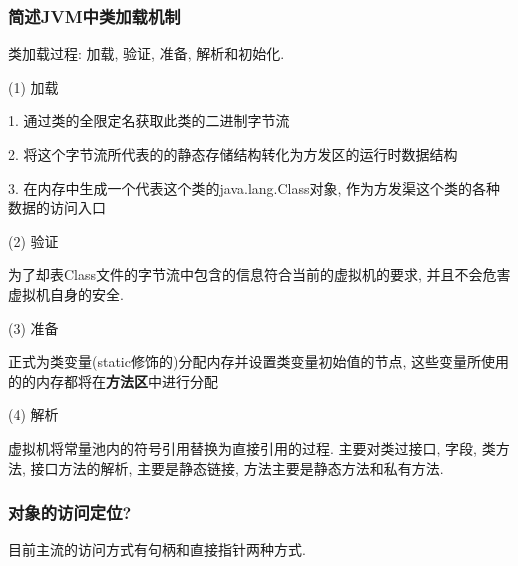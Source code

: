 \documentclass[UTF8]{ctexart}
\begin{document}
\subsubsection{简述JVM中类加载机制}
类加载过程: 加载, 验证, 准备, 解析和初始化. \par
(1) 加载 \par
1. 通过类的全限定名获取此类的二进制字节流 \par
2. 将这个字节流所代表的的静态存储结构转化为方发区的运行时数据结构 \par
3. 在内存中生成一个代表这个类的java.lang.Class对象, 作为方发渠这个类的各种数据的访问入口 \par
(2) 验证 \par
为了却表Class文件的字节流中包含的信息符合当前的虚拟机的要求, 并且不会危害虚拟机自身的安全. \par
(3) 准备 \par
正式为类变量(static修饰的)分配内存并设置类变量初始值的节点, 这些变量所使用的的内存都将在\textbf{方法区}中进行分配 \par
(4) 解析 \par
虚拟机将常量池内的符号引用替换为直接引用的过程. 主要对类过接口, 字段, 类方法, 接口方法的解析, 主要是静态链接, 方法主要是静态方法和私有方法. \par
\subsubsection{对象的访问定位?}
目前主流的访问方式有句柄和直接指针两种方式.
\end{document}
